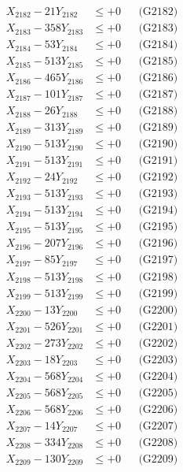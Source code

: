 \documentclass[a4paper,10pt]{article}
\begin{document}
{\begin{align}
X_{2182} - 21Y_{2182} &\leq +0 && \text{(G2182)} \\
X_{2183} - 358Y_{2183} &\leq +0 && \text{(G2183)} \\
X_{2184} - 53Y_{2184} &\leq +0 && \text{(G2184)} \\
X_{2185} - 513Y_{2185} &\leq +0 && \text{(G2185)} \\
X_{2186} - 465Y_{2186} &\leq +0 && \text{(G2186)} \\
X_{2187} - 101Y_{2187} &\leq +0 && \text{(G2187)} \\
X_{2188} - 26Y_{2188} &\leq +0 && \text{(G2188)} \\
X_{2189} - 313Y_{2189} &\leq +0 && \text{(G2189)} \\
X_{2190} - 513Y_{2190} &\leq +0 && \text{(G2190)} \\
\allowbreak
X_{2191} - 513Y_{2191} &\leq +0 && \text{(G2191)} \\
X_{2192} - 24Y_{2192} &\leq +0 && \text{(G2192)} \\
X_{2193} - 513Y_{2193} &\leq +0 && \text{(G2193)} \\
X_{2194} - 513Y_{2194} &\leq +0 && \text{(G2194)} \\
X_{2195} - 513Y_{2195} &\leq +0 && \text{(G2195)} \\
X_{2196} - 207Y_{2196} &\leq +0 && \text{(G2196)} \\
X_{2197} - 85Y_{2197} &\leq +0 && \text{(G2197)} \\
X_{2198} - 513Y_{2198} &\leq +0 && \text{(G2198)} \\
X_{2199} - 513Y_{2199} &\leq +0 && \text{(G2199)} \\
X_{2200} - 13Y_{2200} &\leq +0 && \text{(G2200)} \\
\allowbreak
X_{2201} - 526Y_{2201} &\leq +0 && \text{(G2201)} \\
X_{2202} - 273Y_{2202} &\leq +0 && \text{(G2202)} \\
X_{2203} - 18Y_{2203} &\leq +0 && \text{(G2203)} \\
X_{2204} - 568Y_{2204} &\leq +0 && \text{(G2204)} \\
X_{2205} - 568Y_{2205} &\leq +0 && \text{(G2205)} \\
X_{2206} - 568Y_{2206} &\leq +0 && \text{(G2206)} \\
X_{2207} - 14Y_{2207} &\leq +0 && \text{(G2207)} \\
X_{2208} - 334Y_{2208} &\leq +0 && \text{(G2208)} \\
X_{2209} - 130Y_{2209} &\leq +0 && \text{(G2209)} \\

\end{align}}
\end{document}
